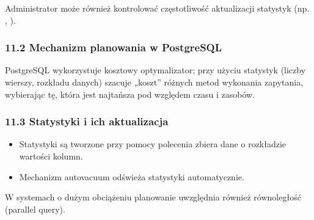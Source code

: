 \documentclass[a4paper,11pt,openany,english]{sphinxmanual}
\begin{document}
\sphinxAtStartPar
Administrator może również kontrolować częstotliwość aktualizacji statystyk (np. , ).


\subsubsection{11.2 Mechanizm planowania w PostgreSQL}
\label{\detokenize{rozdzial2/Konfiguracja_baz_danych/Konfiguracja_baz_danych:mechanizm-planowania-w-postgresql}}
\sphinxAtStartPar
PostgreSQL wykorzystuje kosztowy optymalizator; przy użyciu statystyk (liczby wierszy, rozkładu danych) szacuje „koszt” różnych metod wykonania zapytania, wybierając tę, która jest najtańsza pod względem czasu i zasobów.


\subsubsection{11.3 Statystyki i ich aktualizacja}
\label{\detokenize{rozdzial2/Konfiguracja_baz_danych/Konfiguracja_baz_danych:statystyki-i-ich-aktualizacja}}\begin{itemize}
\item {} 
\sphinxAtStartPar
Statystyki są tworzone przy pomocy polecenia  \textendash{} zbiera dane o rozkładzie wartości kolumn.

\item {} 
\sphinxAtStartPar
Mechanizm autovacuum odświeża statystyki automatycznie.

\end{itemize}

\sphinxAtStartPar
{}

\begin{sphinxVerbatim}[commandchars=\\\{\}]
 \PYG{p}{[}\PYG{p}{]}
\end{sphinxVerbatim}

\sphinxAtStartPar
W systemach o dużym obciążeniu planowanie uwzględnia również równoległość (parallel query).
\end{document}
